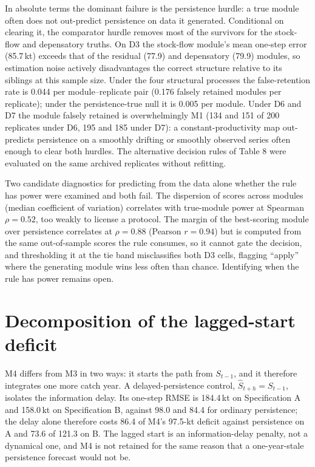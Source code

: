 In absolute terms the dominant failure is the persistence hurdle: a true module often does not out-predict persistence on data it generated. Conditional on clearing it, the comparator hurdle removes most of the survivors for the stock-flow and depensatory truths. On D3 the stock-flow module's mean one-step error (85.7\,kt) exceeds that of the residual (77.9) and depensatory (79.9) modules, so estimation noise actively disadvantages the correct structure relative to its siblings at this sample size. Under the four structural processes the false-retention rate is 0.044 per module--replicate pair (0.176 falsely retained modules per replicate); under the persistence-true null it is 0.005 per module. Under D6 and D7 the module falsely retained is overwhelmingly M1 (134 and 151 of 200 replicates under D6, 195 and 185 under D7): a constant-productivity map out-predicts persistence on a smoothly drifting or smoothly observed series often enough to clear both hurdles. The alternative decision rules of Table 8 were evaluated on the same archived replicates without refitting.

Two candidate diagnostics for predicting from the data alone whether the rule has power were examined and both fail. The dispersion of scores across modules (median coefficient of variation) correlates with true-module power at Spearman $\rho = 0.52$, too weakly to license a protocol. The margin of the best-scoring module over persistence correlates at $\rho = 0.88$ (Pearson $r = 0.94$) but is computed from the same out-of-sample scores the rule consumes, so it cannot gate the decision, and thresholding it at the tie band misclassifies both D3 cells, flagging ``apply'' where the generating module wins less often than chance. Identifying when the rule has power remains open.

\FloatBarrier
\section{Decomposition of the lagged-start deficit}\label{si:m4}

M4 differs from M3 in two ways: it starts the path from $S_{t-1}$, and it therefore integrates one more catch year. A delayed-persistence control, $\hat S_{t+h} = S_{t-1}$, isolates the information delay. Its one-step RMSE is 184.4\,kt on Specification A and 158.0\,kt on Specification B, against 98.0 and 84.4 for ordinary persistence; the delay alone therefore costs 86.4 of M4's 97.5-kt deficit against persistence on A and 73.6 of 121.3 on B. The lagged start is an information-delay penalty, not a dynamical one, and M4 is not retained for the same reason that a one-year-stale persistence forecast would not be.

